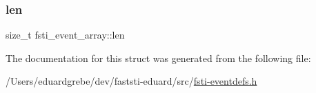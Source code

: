 \mbox{\label{structfsti__event__array_ada6ee09934336597d954b693677a93ad}} 
\subsubsection{\texorpdfstring{len}{len}}
{\footnotesize\ttfamily size\+\_\+t fsti\+\_\+event\+\_\+array\+::len}



The documentation for this struct was generated from the following file\+:\begin{DoxyCompactItemize}
\item 
/\+Users/eduardgrebe/dev/faststi-\/eduard/src/\mbox{\hyperlink{fsti-eventdefs_8h}{fsti-\/eventdefs.\+h}}\end{DoxyCompactItemize}
